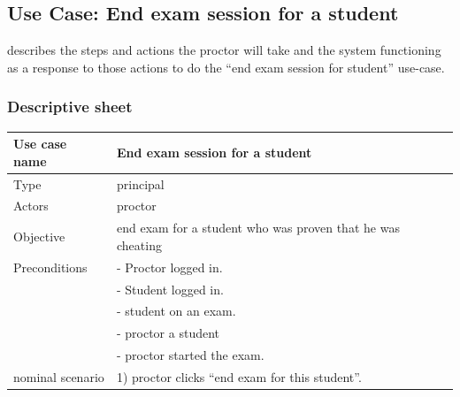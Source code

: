 \documentclass[]{uc2pfecaneva}
\begin{document}
    \thispagestyle{empty}
    \begin{table}[h]
        \raggedright\subsection{Use Case: End exam session for a student}
        describes the steps and actions the proctor will take and the system functioning as a response
        to those actions to do the “end exam session for student” use-case.
        \subsubsection{Descriptive sheet}
        \centering
        \begin{tabularx}{\textwidth}{|l|X|}
            \hline
            Use case name         & End exam session for a student                                                                                                \\ \hline
            Type                  & principal                                                                                                              \\ \hline
            Actors                & proctor                                                                                                                \\ \hline
            Objective             & end exam for a student who was proven that he was cheating                                                             \\ \hline
            Preconditions
            & - Proctor logged in.                                                                                                   \\
            & - Student logged in.                                                                                                   \\
            & - student on an exam.                                                                                                  \\
            & - proctor a student                                                                                                 \\
            & - proctor started the exam.                                                                                            \\ \hline
            nominal scenario
            & 1) proctor clicks “end exam for this student”.                                                                         \\

\end{tabularx}
\end{table}
\end{document}
